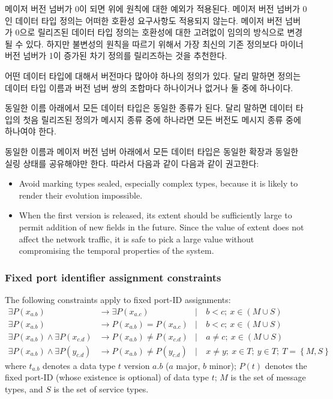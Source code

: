 메이저 버전 넘버가 0이 되면 위에 원칙에 대한 예외가 적용된다.
메이저 버전 넘버가 0인 데이터 타입 정의는 어떠한 호환성 요구사항도 적용되지 않는다.
메이저 버전 넘버가 0으로 릴리즈된 데이터 타입 정의는 호환성에 대한 고려없이 임의의 방식으로 변경될 수 있다.
하지만 불변성의 원칙을 따르기 위해서 가장 최신의 기존 정의보다 마이너 버전 넘버가 1이 증가된 차기 정의를 릴리즈하는 것을 추천한다.

어떤 데이터 타입에 대해서 버전마다 많아야 하나의 정의가 있다.
달리 말하면 정의는 데이터 타입 이름과 버전 넘버 쌍의 조합마다 하나이거나 없거나 둘 중에 하나이다.

동일한 이름 아래에서 모든 데이터 타입은 동일한 종류가 된다.
달리 말하면 데이터 타입의 첫음 릴리즈된 정의가 메시지 종류 중에 하나라면 모든 버전도 메시지 종류 중에 하나여야 한다.

동일한 이름과 메이저 버전 넘버 아래에서 모든 데이터 타입은 동일한 확장과 동일한 실링 상태를 공유해야만 한다.
따라서 다음과 같이 다음과 같이 권고한다:
\begin{itemize}
    \item Avoid marking types sealed, especially complex types,
    because it is likely to render their evolution impossible.

    \item When the first version is released, its extent should be sufficiently large
    to permit addition of new fields in the future.
    Since the value of extent does not affect the network traffic, it is safe to pick a large value
    without compromising the temporal properties of the system.
\end{itemize}

\subsubsection{Fixed port identifier assignment constraints}

The following constraints apply to fixed port-ID assignments:
\begin{align*}
    \exists P(x_{a.b})                          &\rightarrow \exists P(x_{a.c})
    &\mid&\ b < c;\ x \in (M \cup S)
    \\
    \exists P(x_{a.b})                          &\rightarrow         P(x_{a.b}) =    P(x_{a.c})
    &\mid&\ b < c;\ x \in (M \cup S)
    \\
    \exists P(x_{a.b}) \land \exists P(x_{c.d}) &\rightarrow         P(x_{a.b}) \neq P(x_{c.d})
    &\mid&\ a \neq c;\ x \in (M \cup S)
    \\
    \exists P(x_{a.b}) \land \exists P(y_{c.d}) &\rightarrow         P(x_{a.b}) \neq P(y_{c.d})
    &\mid&\ x \neq y;\ x \in T;\ y \in T;\ T = \left\{ M, S \right\}
\end{align*}
where $t_{a.b}$ denotes a data type $t$ version $a.b$ ($a$ major, $b$ minor);
$P(t)$ denotes the fixed port-ID (whose existence is optional) of data type $t$;
$M$ is the set of message types, and $S$ is the set of service types.

